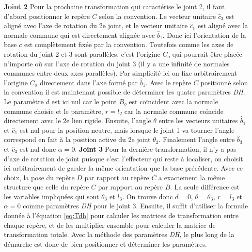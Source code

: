 \textbf{Joint 2 } Pour la prochaine transformation qui caractérise le joint 2, il faut d'abord positionner le repère $C$ selon la convention. Le vecteur unitaire $\hat{c}_3$ est aligné avec l'axe de rotation du 2e joint, et le vecteur unitaire $\hat{c}_1$ est aligné avec la normale commune qui est directement alignée avec $\hat{b}_1$. Donc ici l'orientation de la base $c$ est complètement fixée par la convention. Toutefois comme les axes de rotation du joint 2 et 3 sont parallèles, c'est l'origine $C_o$ qui pourrait être placée n'importe où sur l'axe de rotation du joint 3 (il y a une infinité de normales communes entre deux axes parallèles). Par simplicité ici on fixe arbitrairement l'origine $C_o$ directement dans l'axe formé par $\hat{b}_1$. Avec le repère $C$ positionné selon la convention il est maintenant possible de déterminer les quatre paramètres \textit{DH}. Le paramètre $d$ est ici nul car le point $B_o$ est coïncident avec la normale commune choisie et le paramètre, $r=l_2$ car la normale commune coïncide directement avec le 2e lien rigide. Ensuite, l'angle $\theta$ entre les vecteurs unitaires $\hat{b}_1$ et $\hat{c}_1$ est nul pour la position neutre, mais lorsque le joint 1 va tourner l'angle correspond en fait à la position active du 2e joint $\theta_2$. Finalement l'angle entre $\hat{b}_3$ et $\hat{c}_3$ est nul donc $\alpha=0$.
%
\textbf{Joint 3 } Pour la dernière transformation, il n'y a pas d'axe de rotation de joint puisque c'est l'effecteur qui reste à localiser, on choisit ici arbitrairement de garder la même orientation que la base précédente. Avec ce choix, la pose du repère $D$ par rapport au repère $C$ a exactement la même structure que celle du repère $C$ par rapport au repère $B$. La seule différence est les variables impliquées qui sont $\theta_3$ et $l_3$. On trouve donc $d=0$, $\theta= \theta_3$, $r=l_3$ et $\alpha=0$ comme paramètres \textit{DH} pour le joint 3.
%
Ensuite, il suffit d'utiliser la formule donnée à l'équation \eqref{eq:Tdh} pour calculer les matrices de transformation entre chaque repère, et de les multiplier ensemble pour calculer la matrice de transformation totale. Avec la méthode des paramètres \textit{DH}, le plus long de la démarche est donc de bien positionner et déterminer les paramètres.

